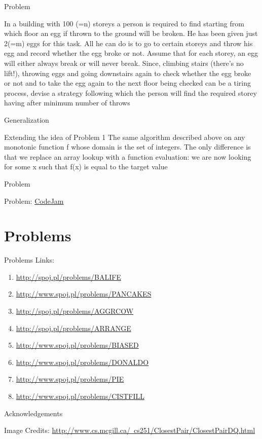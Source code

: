 \documentclass{beamer}
\begin{document}
\begin{frame}{Problem}
  \begin{block}{}
    In a building with 100 (=n) storeys a person is required to find starting from which floor an egg if thrown to the ground will be broken. He has been given just 2(=m) eggs for this task. All he can do is to go to certain storeys and throw his egg and record whether the egg broke or not. Assume that for each storey, an egg will either always break or will never break. Since, climbing stairs (there's no lift!), throwing eggs and going downstairs again to check whether the egg broke or not and to take the egg again to the next floor being checked can be a tiring process, devise a strategy following which the person will find the required storey having after minimum number of throws
  \end{block}
\end{frame}

\begin{frame}{Generalization}
  \begin{block}{Extending the idea of Problem 1}
    The same algorithm described above on any monotonic function f whose domain is the set of integers. The only difference is that we replace an array lookup with a function evaluation: we are now looking for some x such that f(x) is equal to the target value
  \end{block}
\end{frame}

\begin{frame}{Problem}
  \begin{block}{Problem:}
  \href{http://code.google.com/codejam/contest/1150485/dashboard\#s=p1&a=1}{CodeJam}
  \end{block}
\end{frame}

\section{Problems}

\begin{frame}{Problems}
Links:
\begin{enumerate}
\item \url{http://spoj.pl/problems/BALIFE}
\item \url{http://www.spoj.pl/problems/PANCAKES}
\item \url{http://spoj.pl/problems/AGGRCOW}
\item \url{http://spoj.pl/problems/ARRANGE}
\item \url{http://www.spoj.pl/problems/BIASED}
\item \url{http://www.spoj.pl/problems/DONALDO}
\item \url{http://www.spoj.pl/problems/PIE}
\item \url{http://www.spoj.pl/problems/CISTFILL}
\end{enumerate}
\end{frame}

\begin{frame}{Acknowledgements}
  \begin{block}{}
    Image Credits:
      \href{http://www.cs.mcgill.ca/~cs251/ClosestPair/ClosestPairDQ.html}{http://www.cs.mcgill.ca/~cs251/ClosestPair/ClosestPairDQ.html}
  \end{block}
\end{frame}
\end{document}
